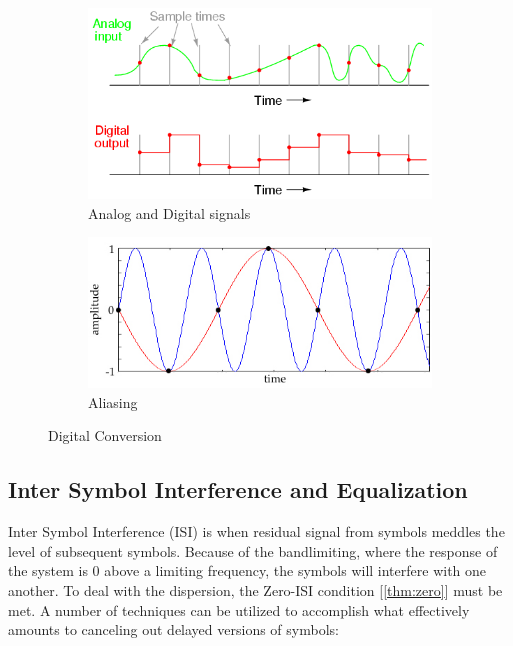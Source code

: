 \documentclass[]{article}
\begin{document}
\begin{figure}[h]
        \centering
        \begin{subfigure}[b]{0.4\textwidth}
                \includegraphics[width=\textwidth]{digitization.png}
                \caption{Analog and Digital signals}
                \label{fig:digitization}
        \end{subfigure}%
        \qquad \quad %
        \begin{subfigure}[b]{0.5\textwidth}
                \includegraphics[width=\textwidth]{aliasing.jpg}
                \caption{Aliasing \label{fig:alias}}
                \label{fig:alias}
        \end{subfigure}
        \caption{Digital Conversion \label{fig:digitize}}
\end{figure}

\newpage
\subsection{Inter Symbol Interference and Equalization}
\label{sec:ISIbackground}
Inter Symbol Interference (ISI) is when residual signal from symbols meddles the level of subsequent symbols.  Because of the bandlimiting, where the response of the system is 0 above a limiting frequency, the symbols will interfere with one another. To deal with the dispersion, the Zero-ISI condition [\ref{thm:zero}] must be met.  A number of techniques can be utilized to accomplish what effectively amounts to canceling out delayed versions of symbols:
\end{document}
